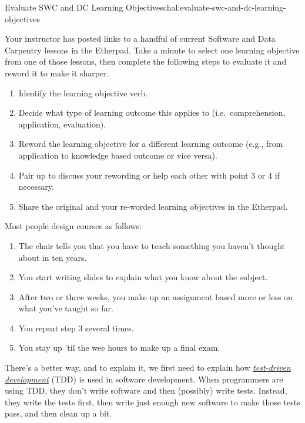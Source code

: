 \begin{challenge}{Evaluate SWC and DC Learning Objectives}{chal:evaluate-swc-and-dc-learning-objectives}

Your instructor has posted links to a handful of current Software and
Data Carpentry lessons in the Etherpad. Take a minute to select one
learning objective from one of those lessons, then complete the
following steps to evaluate it and reword it to make it sharper.

\begin{enumerate}
\item
  Identify the learning objective verb.
\item
  Decide what type of learning outcome this applies to
  (i.e.~comprehension, application, evaluation).
\item
  Reword the learning objective for a different learning outcome (e.g.,
  from application to knowledge based outcome or vice versa).
\item
  Pair up to discuss your rewording or help each other with point 3 or 4
  if necessary.
\item
  Share the original and your re-worded learning objectives in the Etherpad.
\end{enumerate}
\end{challenge}


Most people design courses as follows:

\begin{enumerate}
\item
  The chair tells you that you have to teach something you haven't
  thought about in ten years.
\item
  You start writing slides to explain what you know about the subject.
\item
  After two or three weeks, you make up an assignment based more or less
  on what you've taught so far.
\item
  You repeat step 3 several times.
\item
  You stay up 'til the wee hours to make up a final exam.
\end{enumerate}

There's a better way, and to explain it, we first need to explain how
\emph{\href{https://en.wikipedia.org/wiki/Test-driven\_development}{test-driven
development}} (TDD) is used in software development. When programmers
are using TDD, they don't write software and then (possibly) write
tests. Instead, they write the tests first, then write just enough new
software to make those tests pass, and then clean up a bit.

